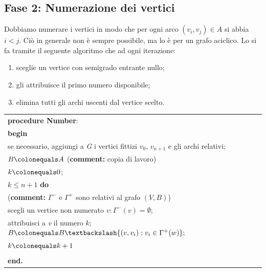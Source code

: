 \documentclass[11pt]{book}
\begin{document}
\subsection{Fase 2: Numerazione dei vertici}

Dobbiamo numerare i vertici in modo che per ogni arco $(v_i,v_j) \in
A$ si abbia $i < j$. Ci\`o in generale non \`e sempre possibile, ma lo
\`e per un grafo aciclico. Lo si fa tramite il seguente algoritmo che
ad ogni iterazione:

\begin{enumerate}
\item sceglie un vertice con semigrado entrante nullo;
\item gli attribuisce il primo numero disponibile;
\item elimina tutti gli archi uscenti dal vertice scelto.
\end{enumerate}

\vspace{11pt}
\begin{center}
  \begin{tabular}{||l||}
    \hline\hline
    {\bf procedure Number}:\\
    {\bf begin}\\
    \phantom{aa}se necessario, aggiungi a {\em G} i vertici fittizi
    $v_0$, $v_{n+1}$ e gli archi relativi;\\
    \phantom{aa}$B \colonequals A$ ({\bf comment:} copia di lavoro)\\
    \phantom{aa}$k \colonequals 0$;\\
    \phantom{aa}{\bf while} $k \leq n+1$ {\bf do}\\
    \phantom{aaaa}{\bf begin} ({\bf comment:} $\Gamma^-$ e $\Gamma^+$
    sono relativi al grafo $(V,B)$)\\
    \phantom{aaaaaa}scegli un vertice non numerato $v: \Gamma^-(v) = \emptyset$;\\
    \phantom{aaaaaa}attribuisci a {\em v} il numero $k$;
    \phantom{aaaaaa}$B \colonequals B \textbackslash \{(v,v_i) : v_i \in
    \Gamma^+(w)\};$\\
    \phantom{aaaaaa}$k \colonequals k+1$\\
    \phantom{aaaa}{\bf end}\\
    {\bf end.}\\
    \hline\hline
  \end{tabular}
\end{center}
\vspace{11pt}
\end{document}
